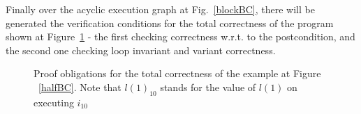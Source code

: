 
Finally over the acyclic execution graph at Fig.~\ref{blockBC}, there will be generated the verification conditions for the total correctness of the program shown at Figure~\ref{pogs} - the first checking correctness w.r.t. to the postcondition, and the second one checking loop invariant and variant correctness.
\begin{figure}


\caption{Proof obligations for the total correctness of the example at Figure ~\ref{halfBC}. Note that $l(1)_{10}$ stands for the value of $l(1)$ on executing $i_{10}$  }
\label{pogs}
\end{figure}
